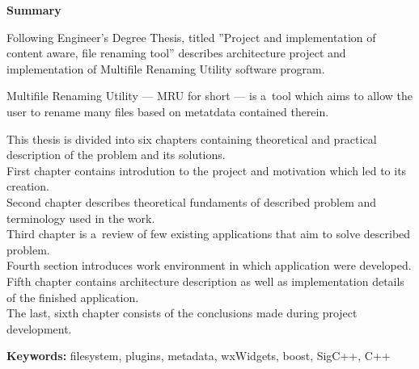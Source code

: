\clearpage

\begin{center}
\textbf{Summary}
\end{center}

\par
Following Engineer's Degree Thesis, titled ''Project and implementation of content aware, file renaming tool'' describes architecture project and implementation of Multifile Renaming Utility software program.

\par
Multifile Renaming Utility --- MRU for short --- is a~tool which aims to allow the user to rename many files based on metatdata contained therein.

\par
This thesis is divided into six chapters containing theoretical and practical description of the problem and its solutions.\\
First chapter contains introdution to the project and motivation which led to its creation.\\
Second chapter describes theoretical fundaments of described problem and terminology used in the work.\\
Third chapter is a~review of few existing applications that aim to solve described problem.\\
Fourth section introduces work environment in which application were developed.\\
Fifth chapter contains architecture description as well as implementation details of the finished application.\\
The last, sixth chapter consists of the conclusions made during project development.

\vspace*{\baselineskip}

\noindent\textbf{Keywords:} filesystem, plugins, metadata, wxWidgets, boost, SigC++, C++
